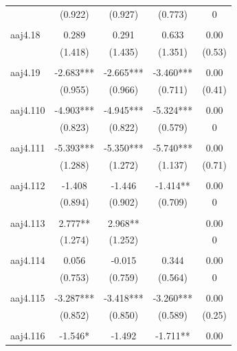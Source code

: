 \documentclass[12pt, a4paper]{article}
\begin{document}
{\begin{longtable}{@{\extracolsep{5pt}}lcccc}
				& (0.922)    & (0.927)    & (0.773)   & 0       \\
				&            &            &           &         \\
				aaj4.18    & 0.289      & 0.291      & 0.633     & 0.00    \\
				& (1.418)    & (1.435)    & (1.351)   & (0.53)  \\
				&            &            &           &         \\
				aaj4.19    & -2.683***  & -2.665***  & -3.460*** & 0.00    \\
				& (0.955)    & (0.966)    & (0.711)   & (0.41)  \\
				&            &            &           &         \\
				aaj4.110   & -4.903***  & -4.945***  & -5.324*** & 0.00    \\
				& (0.823)    & (0.822)    & (0.579)   & 0       \\
				&            &            &           &         \\
				aaj4.111   & -5.393***  & -5.350***  & -5.740*** & 0.00    \\
				& (1.288)    & (1.272)    & (1.137)   & (0.71)  \\
				&            &            &           &         \\
				aaj4.112   & -1.408     & -1.446     & -1.414**  & 0.00    \\
				& (0.894)    & (0.902)    & (0.709)   & 0       \\
				&            &            &           &         \\
				aaj4.113   & 2.777**    & 2.968**    &           & 0.00    \\
				& (1.274)    & (1.252)    &           & 0       \\
				&            &            &           &         \\
				aaj4.114   & 0.056      & -0.015     & 0.344     & 0.00    \\
				& (0.753)    & (0.759)    & (0.564)   & 0       \\
				&            &            &           &         \\
				aaj4.115   & -3.287***  & -3.418***  & -3.260*** & 0.00    \\
				& (0.852)    & (0.850)    & (0.589)   & (0.25)  \\
				&            &            &           &         \\
				aaj4.116   & -1.546*    & -1.492     & -1.711**  & 0.00    \\

\end{longtable}}
\end{document}
